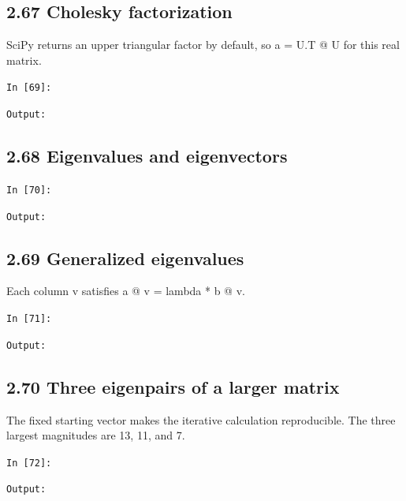 \documentclass[11pt]{article}
\begin{document}
\par\medskip\noindent\begin{minipage}{\linewidth}
\subsection*{2.67 Cholesky factorization}
SciPy returns an upper triangular factor by default, so a = U.T @ U for this real matrix.

\noindent\texttt{In [69]:}

\noindent\texttt{Output:}

\end{minipage}\par

\par\medskip\noindent\begin{minipage}{\linewidth}
\subsection*{2.68 Eigenvalues and eigenvectors}
\noindent\texttt{In [70]:}

\noindent\texttt{Output:}

\end{minipage}\par

\par\medskip\noindent\begin{minipage}{\linewidth}
\subsection*{2.69 Generalized eigenvalues}
Each column v satisfies a @ v = lambda * b @ v.

\noindent\texttt{In [71]:}

\noindent\texttt{Output:}

\end{minipage}\par

\par\medskip\noindent\begin{minipage}{\linewidth}
\subsection*{2.70 Three eigenpairs of a larger matrix}
The fixed starting vector makes the iterative calculation reproducible. The three largest magnitudes are 13, 11, and 7.

\noindent\texttt{In [72]:}

\noindent\texttt{Output:}

\end{minipage}\par
\end{document}
